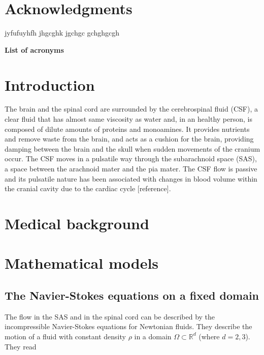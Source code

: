 \documentclass[a4paper,11pt,openright,twoside]{book}
\begin{document}
\chapter*{\LARGE Acknowledgments}
jyfufuyhfh
jhgcghk
jgchgc
gchghgcgh

\newpage

{\Large \textbf{List of acronyms}}



\newpage
\tableofcontents


\newpage
{}

\chapter{Introduction}

The brain and the spinal cord are surrounded by the cerebrospinal fluid (CSF), a clear fluid that has almost same viscosity as water and, in an healthy person, is composed of dilute amounts of proteins and monoamines. It provides nutrients and remove waste from the brain, and acts as a cushion for the brain, providing damping between the brain and the skull when sudden movements of the cranium occur. The CSF moves in a pulsatile way through the subarachnoid space (SAS), a space between the arachnoid mater and the pia mater. The CSF flow is passive and its pulsatile nature has been associated with changes in blood volume within the cranial cavity due to the cardiac cycle [reference].

\chapter{Medical background}

\chapter{Mathematical models}

\section{The Navier-Stokes equations on a fixed domain}


The flow in the SAS and in the spinal cord can be described by the incompressible Navier-Stokes equations for Newtonian fluids. They describe the motion of a fluid with constant density $\rho$ in a domain $\Omega \subset \mathbb{R}^d$ (where $d=2,3$). They read
\end{document}
